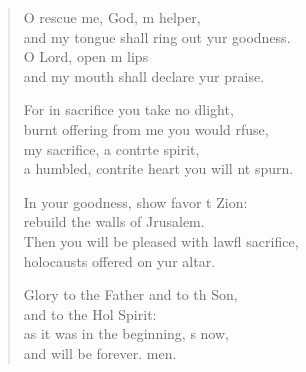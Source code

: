 \begin{verse}
\begin{patverse}
O rescue me, God, m helper,\Med\\
and my tongue shall ring out yur goodness.\\
O Lord, open m lips\Med\\
and my mouth shall declare yur praise.

For in sacrifice you take no dlight,\Med\\
burnt offering from me you would rfuse,\\
my sacrifice, a contr\pointup{\i}te spirit,\Med\\
a humbled, contrite heart you will nt spurn.

In your goodness, show favor t Zion:\Med\\
rebuild the walls of Jrusalem.\\
Then you will be pleased with lawfl sacrifice,\Med\\
holocausts offered on yur altar.

Glory to the Father and to th Son,\Med\\
and to the Hol Spirit:\\
as it was in the beginning, \pointup{\i}s now,\Med\\
and will be forever. men.
  \end{patverse}
\end{verse}
